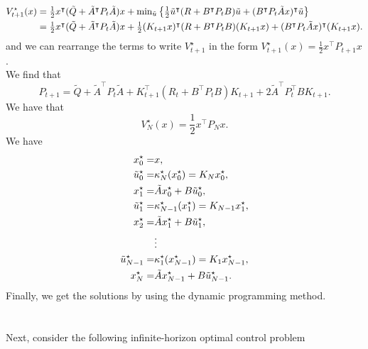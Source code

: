 \documentclass[a4paper,11pt,reqno]{amsart}
\newcommand{\tran}{\intercal}
\begin{document}
\begin{align}
    V_{t+1}^{\star}(x)&=\textstyle\frac{1}{2}x^{\tran}(\tilde{Q}+\tilde{A}^{\tran}P_t\tilde{A})x+\min_{\tilde{u}}\left\{\textstyle\frac{1}{2}\tilde{u}^{\tran}(R+B^{\tran}P_tB)\tilde{u}+(B^{\tran}P_t\tilde{A}x)^{\tran}\tilde{u}\right\}\notag\\
    &=\textstyle\frac{1}{2}x^{\tran}(\tilde{Q}+\tilde{A}^{\tran}P_t\tilde{A})x+\frac{1}{2}(K_{t+1}x)^{\tran}(R+B^{\tran}P_tB)(K_{t+1}x)+(B^{\tran}P_t\tilde{A}x)^{\tran}(K_{t+1}x).
\end{align}
and we can rearrange the terms to write $V_{t+1}^{\star}$ in the form $V_{t+1}^{\star}(x)=\textstyle\frac{1}{2}x^{\tran}P_{t+1}x$.\\
We find that
\begin{equation}
    P_{t+1}=\tilde{Q}+\tilde{A}^{\tran}P_t\tilde{A}+K_{t+1}^{\tran}(R_t+B^{\tran}P_tB)K_{t+1}+2\tilde{A}^{\tran}P_t^{\tran}BK_{t+1}.
\end{equation}
We have that
\begin{equation}
    V_{N}^{\star}(x)=\textstyle\frac{1}{2}x^{\tran}P_Nx.
\end{equation}
We have
\begin{align}
    x_0^{\star}=&x,\notag\\
    \tilde{u}_0^{\star}=&\kappa_N^{\star}(x_0^{\star})=K_Nx_0^{\star},\notag\\
    x_1^{\star}=&\tilde{A}x_0^{\star}+B\tilde{u}_0^{\star},\notag\\
    \tilde{u}_1^{\star}=&\kappa_{N-1}^{\star}(x_1^{\star})=K_{N-1}x_1^{\star},\notag\\
    x_2^{\star}=&\tilde{A}x_1^{\star}+B\tilde{u}_1^{\star},\notag\\
    &\vdots \notag\\
    \tilde{u}_{N-1}^{\star}=&\kappa_1^{\star}(x_{N-1}^{\star})=K_1x_{N-1}^{\star},\notag\\
    x_N^{\star}=&\tilde{A}x_{N-1}^{\star}+B\tilde{u}_{N-1}^{\star}.\notag
\end{align}
Finally, we get the solutions by using the dynamic programming method.
\\ \\ \\
Next, consider the following infinite-horizon optimal control problem
\end{document}

